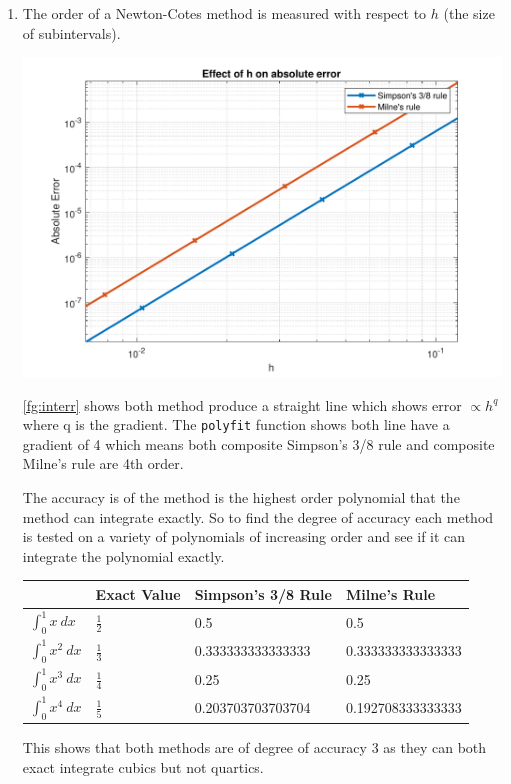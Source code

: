 \documentclass[a4paper,11pt]{article}
\begin{document}
\begin{enumerate}
\begin{enumerate}
		
		\item The order of a Newton-Cotes method is measured with respect to 
		$h$ (the size of subintervals).
		\begin{center}
			\includegraphics[scale=0.7]{images/Q2aii.pdf}
			\label{fg:interr}
		\end{center}
		\autoref{fg:interr} shows both method produce a straight line which 
		shows error $\propto h^{q}$ where q is the gradient. The 
		\verb*|polyfit| function shows both line have a gradient of 4 which 
		means both composite Simpson's 3/8 rule and composite Milne's rule 
		are 4th order.
		
		The accuracy is of the method is the highest order polynomial that 
		the method can 
		integrate exactly. So to find the degree of accuracy each method is
		tested on a variety of polynomials of increasing order and see if it 
		can integrate the polynomial exactly.
		
		\begin{center}
			\begin{tabular}{l|lll}
				& Exact Value    & Simpson's 3/8 Rule & Milne's Rule      \\ 
				\hline
				$\int_{0}^{1}x \ dx$     & $\frac{1}{2}$ & 0.5               
				& 0.5               \\
				$\int_{0}^{1}x^{2} \ dx$ & $\frac{1}{3}$ & 0.333333333333333 
				& 0.333333333333333 \\
				$\int_{0}^{1}x^{3} \ dx$ & $\frac{1}{4}$ & 0.25              
				& 0.25              \\
				$\int_{0}^{1}x^{4} \ dx$ & $\frac{1}{5}$ & 0.203703703703704 
				& 0.192708333333333
			\end{tabular}
		\end{center}
		This shows that both methods are of degree of accuracy 3 as they can 
		both exact integrate cubics but not quartics.
		

\end{enumerate}
\end{enumerate}
\end{document}
